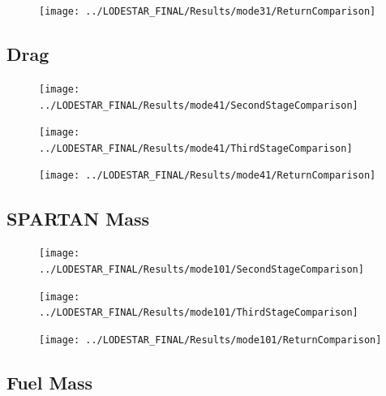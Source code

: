 \begin{figure}[th]
\centering
\texttt{[image: ../LODESTAR\_FINAL/Results/mode31/ReturnComparison]}
\caption{}
\label{fig:ReturnComparison10}
\end{figure}


\subsection{Drag}\label{sec:app_comparison41}
\begin{figure}[th]
\centering
\texttt{[image: ../LODESTAR\_FINAL/Results/mode41/SecondStageComparison]}
\caption{}
\label{fig:SecondStageComparison11}
\end{figure}

\begin{figure}[th]
\centering
\texttt{[image: ../LODESTAR\_FINAL/Results/mode41/ThirdStageComparison]}
\caption{}
\label{fig:ThirdStageComparison11}
\end{figure}

\begin{figure}[th]
\centering
\texttt{[image: ../LODESTAR\_FINAL/Results/mode41/ReturnComparison]}
\caption{}
\label{fig:ReturnComparison11}
\end{figure}


\subsection{SPARTAN Mass}\label{sec:app_comparison101}

\begin{figure}[th]
\centering
\texttt{[image: ../LODESTAR\_FINAL/Results/mode101/SecondStageComparison]}
\caption{}
\label{fig:SecondStageComparison12}
\end{figure}

\begin{figure}[th]
\centering
\texttt{[image: ../LODESTAR\_FINAL/Results/mode101/ThirdStageComparison]}
\caption{}
\label{fig:ThirdStageComparison12}
\end{figure}

\begin{figure}[th]
\centering
\texttt{[image: ../LODESTAR\_FINAL/Results/mode101/ReturnComparison]}
\caption{}
\label{fig:ReturnComparison12}
\end{figure}


\subsection{Fuel Mass}\label{sec:app_comparison111}

